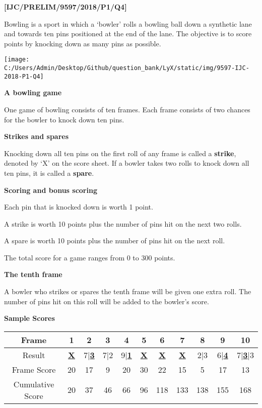 \item \textbf{{[}IJC/PRELIM/9597/2018/P1/Q4{]} }

Bowling is a sport in which a \textquoteleft bowler\textquoteright{}
rolls a bowling ball down a synthetic lane and towards ten pins positioned
at the end of the lane. The objective is to score points by knocking
down as many pins as possible. 
\begin{center}
\texttt{[image: C:/Users/Admin/Desktop/Github/question\_bank/LyX/static/img/9597-IJC-2018-P1-Q4]}
\par\end{center}

\textbf{A bowling game }

One game of bowling consists of ten frames. Each frame consists of
two chances for the bowler to knock down ten pins.

\textbf{Strikes and spares }

Knocking down all ten pins on the first roll of any frame is called
a \textbf{strike}, denoted by \textquoteleft X\textquoteright{} on
the score sheet. If a bowler takes two rolls to knock down all ten
pins, it is called a \textbf{spare}.

\textbf{Scoring and bonus scoring}

Each pin that is knocked down is worth 1 point. 

A strike is worth 10 points plus the number of pins hit on the next
two rolls.

A spare is worth 10 points plus the number of pins hit on the next
roll.

The total score for a game ranges from 0 to 300 points.

\textbf{The tenth frame }

A bowler who strikes or spares the tenth frame will be given one extra
roll. The number of pins hit on this roll will be added to the bowler\textquoteright s
score.

\textbf{Sample Scores} 

\begin{tabular}{|c|c|c|c|c|c|c|c|c|c|c|}
\hline 
Frame & 1 & 2 & 3 & 4 & 5 & 6 & 7 & 8 & 9 & 10\tabularnewline
\hline 
Result & \textbf{\uline{X}} & 7|\textbf{\uline{3}} & 7|2 & 9|\textbf{\uline{1}} & \textbf{\uline{X}} & \textbf{\uline{X}} & \textbf{\uline{X}} & 2|3 & 6|\textbf{\uline{4}} & 7|\textbf{\uline{3}}|3\tabularnewline
\hline 
Frame Score & 20 & 17 & 9 & 20 & 30 & 22 & 15 & 5 & 17 & 13\tabularnewline
\hline 
Cumulative Score & 20 & 37 & 46 & 66 & 96 & 118 & 133 & 138 & 155 & 168\tabularnewline
\hline 
\end{tabular}

